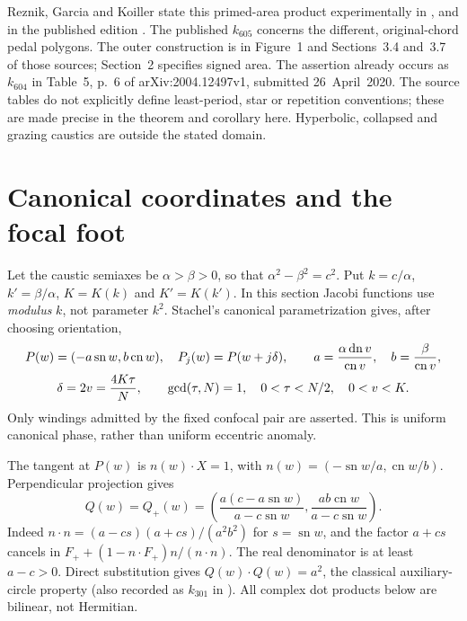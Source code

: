 \documentclass[11pt]{article}
\newcommand{\sn}{\operatorname{sn}}
\newcommand{\cn}{\operatorname{cn}}
\newcommand{\dn}{\operatorname{dn}}
\begin{document}
Reznik, Garcia and Koiller state this primed-area product experimentally in
\cite[Table 7, p.~9, $k_{605,a}$]{RGK}, and in the published edition
\cite[Table 7, p.~349, $k_{606}$]{RGKfinal}. The published $k_{605}$ concerns
the different, original-chord pedal polygons. The outer construction is in
Figure~1 and Sections~3.4 and~3.7 of those sources; Section~2 specifies signed
area. The assertion already occurs as $k_{604}$ in Table~5, p.~6 of
arXiv:2004.12497v1, submitted 26~April~2020. The source tables do not
explicitly define least-period, star or repetition conventions; these are
made precise in the theorem and corollary here. Hyperbolic, collapsed and
grazing caustics are outside the stated domain.

\section{Canonical coordinates and the focal foot}
Let the caustic semiaxes be $\alpha>\beta>0$, so that
$\alpha^2-\beta^2=c^2$. Put $k=c/\alpha$, $k'=\beta/\alpha$,
$K=K(k)$ and $K'=K(k')$. In this section Jacobi functions use
\emph{modulus} $k$, not parameter $k^2$. Stachel's canonical
parametrization \cite[Theorem 4.3, equation (4.9), p.~1614]{Stachel} gives,
after choosing orientation,
\begin{gather}\label{eq:canonical}
 P(w)=(-a\sn w,b\cn w),\quad P_j(w)=P(w+j\delta),\qquad
 a=\frac{\alpha\dn v}{\cn v},\quad b=\frac{\beta}{\cn v},\\
 \delta=2v=\frac{4K\tau}{N},\qquad
 \gcd(\tau,N)=1,\quad 0<\tau<N/2,\quad 0<v<K.\notag
\end{gather}
Only windings admitted by the fixed confocal pair are asserted. This is
uniform canonical phase, rather than uniform eccentric anomaly.

The tangent at $P(w)$ is $n(w)\cdot X=1$, with
$n(w)=(-\sn w/a,\cn w/b)$. Perpendicular projection gives
\begin{equation}\label{eq:foot}
 Q(w)=Q_+(w)=
 \left(\frac{a(c-a\sn w)}{a-c\sn w},
       \frac{ab\cn w}{a-c\sn w}\right).
\end{equation}
Indeed $n\cdot n=(a-cs)(a+cs)/(a^2b^2)$ for $s=\sn w$, and the
factor $a+cs$ cancels in $F_++(1-n\cdot F_+)n/(n\cdot n)$.
The real denominator is at least $a-c>0$. Direct substitution gives
$Q(w)\cdot Q(w)=a^2$, the classical auxiliary-circle property
(also recorded as $k_{301}$ in \cite{RGK}). All complex dot products below
are bilinear, not Hermitian.
\end{document}
